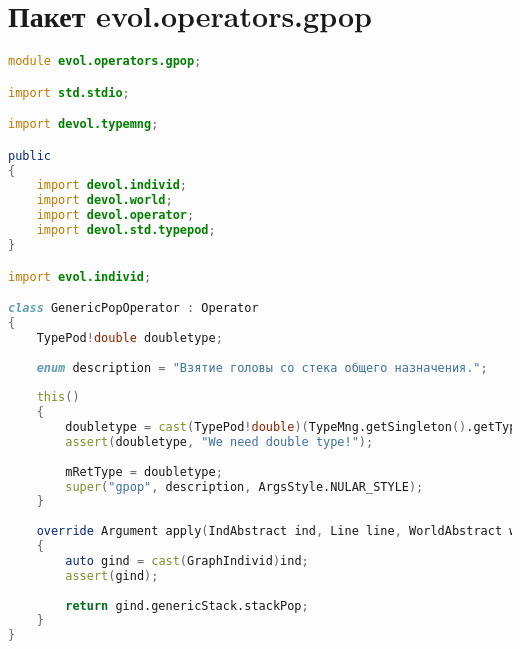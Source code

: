 \documentclass[russian,utf8,emptystyle]{eskdtext}
\begin{document}
\section{Пакет evol.operators.gpop}
\begin{lstlisting}[language=D]
module evol.operators.gpop;

import std.stdio;

import devol.typemng;

public
{
    import devol.individ;
    import devol.world;
    import devol.operator;
    import devol.std.typepod;
}

import evol.individ;

class GenericPopOperator : Operator
{
    TypePod!double doubletype;
    
    enum description = "Взятие головы со стека общего назначения.";
    
    this()
    {
        doubletype = cast(TypePod!double)(TypeMng.getSingleton().getType("Typedouble"));
        assert(doubletype, "We need double type!");
        
        mRetType = doubletype;
        super("gpop", description, ArgsStyle.NULAR_STYLE);
    }
    
    override Argument apply(IndAbstract ind, Line line, WorldAbstract world)
    {
        auto gind = cast(GraphIndivid)ind;
        assert(gind);
        
        return gind.genericStack.stackPop;
    }   
}
\end{lstlisting}
\end{document}
